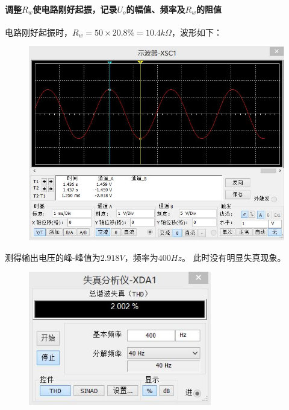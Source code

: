 \documentclass[12pt,a4paper]{article}
\begin{document}
\begin{spacing}{1.3}
\paragraph{调整$R_w$使电路刚好起振，记录$U_o$的幅值、频率及$R_w$的阻值} 电路刚好起振时，$R_w = 50\times 20.8\% = 10.4k\Omega$，波形如下：
\begin{figure}[H]
\centering
\includegraphics[width=\textwidth]{4-.jpg}
\end{figure}
测得输出电压的峰-峰值为$2.918V$，频率为$400Hz$。
此时没有明显失真现象。
\begin{figure}[H]
\centering
\includegraphics[width=8cm]{5-.jpg}
\end{figure}

\end{spacing}
\end{document}
